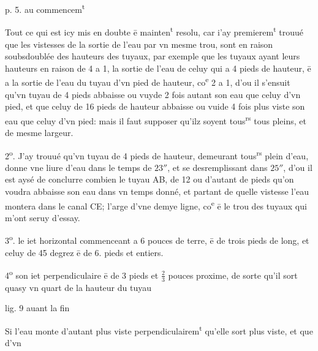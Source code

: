 \documentclass[11pt,a4paper]{article}
\begin{document}
p. 5. au commencem\textsuperscript{t}

Tout ce qui est icy mis en doubte ē mainten\textsuperscript{t} resolu, car i'ay premierem\textsuperscript{t} trouué que les vistesses de la sortie de l'eau par vn mesme trou, sont en raison soubsdoublée des hauteurs des tuyaux, par exemple que les tuyaux ayant leurs hauteurs en raison de 4 a 1, la sortie de l'eau de celuy qui a 4 pieds de hauteur, ē a la sortie de l'eau du tuyau d'vn pied de hauteur, co\textsuperscript{e} 2 a 1, d'ou il s'ensuit qu'vn tuyau de 4 pieds abbaisse ou vuyde 2 fois autant son eau que celuy d'vn pied, et que celuy de 16 pieds de hauteur abbaisse ou vuide 4 fois plus viste son eau que celuy d'vn pied: mais il faut supposer qu'ilz soyent tous\textsuperscript{rs} tous pleins, et de mesme largeur.

2\textsuperscript{o}. J'ay trouué qu'vn tuyau de 4 pieds de hauteur, demeurant tous\textsuperscript{rs} plein d'eau, donne vne liure d'eau dans le temps de $23''$, et se desremplissant dans $25''$, d'ou il est aysé de conclurre combien le tuyau AB, de 12 ou d'autant de pieds qu'on voudra abbaisse son eau dans vn temps donné, et partant de quelle vistesse l'eau montera dans le canal CE; l'arge \struck{\ill{}} d'vne demye ligne, co\textsuperscript{e} ē le trou des tuyaux qui m'ont seruy d'essay.

3\textsuperscript{o}. le iet horizontal commenceant a 6 pouces de terre, ē de trois pieds de long, et celuy de 45 degrez ē de 6. pieds et entiers.

4\textsuperscript{o} son iet perpendiculaire ē de 3 pieds et $\frac{2}{3}$ pouces proxime, de sorte qu'il sort quasy vn quart de la hauteur du tuyau

lig. 9 auant la fin

Si l'eau monte d'autant plus viste perpendiculairem\textsuperscript{t} qu'elle sort plus viste, et que d'vn
\end{document}
